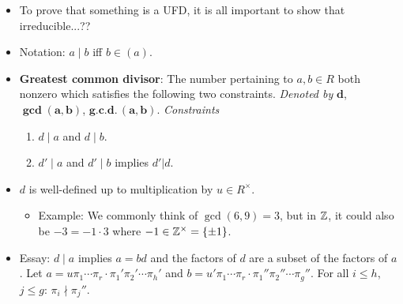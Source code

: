 \documentclass[../notes.tex]{subfiles}
\begin{document}
\begin{itemize}
\begin{proof}
        \begin{align*}
            a &= a\\
            u\pi_1\cdots\pi_r &= u'\pi_1'\cdots\pi_s'\\
            u\pi_1\cdots\pi_r &= u'u_1\pi_1\pi_2'\cdots\pi_s'\\
            u\pi_2\cdots\pi_r &= u'u_1\pi_2'\cdots\pi_s'
        \end{align*}
        where we apply the cancellation lemma in the last step, as permitted by the facts that $R$ is an integral domain and $\pi_1$ is irreducible (hence nonzero). Thus, by the induction hypothesis, the factorizations $u\pi_2\cdots\pi_r$ and $u'u_1\pi_2'\cdots\pi_s'$ are equivalent. It follows that $r=s$ and there exists $\sigma\in S_{[2:r]}$ and units $u_2,\dots,u_r\in R^\times$ such that $\pi_i'=u_i\pi_{\sigma(i)}$ ($i=2,\dots,r$). Extend $\sigma$ to $S_r$ by defining $\sigma(1)=1$. Thus, taking $\sigma\in S_r$ and $u_1,\dots,u_r\in R^\times$, we know that $\pi_i'=u_i\pi_i$ ($i=1,\dots,r$). Therefore, $u\pi_1\cdots\pi_r$ and $u'\pi_1'\cdots\pi_s'$ are equivalent factorizations of $a$, as desired.
    \end{proof}
    \item To prove that something is a UFD, it is all important to show that irreducible...??
    \item Notation: $a\mid b$ iff $b\in(a)$.
    \item \textbf{Greatest common divisor}: The number pertaining to $a,b\in R$ both nonzero which satisfies the following two constraints. \emph{Denoted by} $\bm{d}$, $\bm{\gcd(a,b)}$, $\bm{\textbf{g.c.d.}\,(a,b)}$. \emph{Constraints}
    \begin{enumerate}[label={(\roman*)}]
        \item $d\mid a$ and $d\mid b$.
        \item $d'\mid a$ and $d'\mid b$ implies $d'|d$.
    \end{enumerate}
    \item $d$ is well-defined up to multiplication by $u\in R^\times$.
    \begin{itemize}
        \item Example: We commonly think of $\gcd(6,9)=3$, but in $\mathbb{Z}$, it could also be $-3=-1\cdot 3$ where $-1\in\mathbb{Z}^\times=\{\pm 1\}$.
    \end{itemize}
    \item Essay: $d\mid a$ implies $a=bd$ and the factors of $d$ are a subset of the factors of $a$. Let $a=u\pi_1\cdots\pi_r\cdot\pi_1'\pi_2'\cdots\pi_h'$ and $b=u'\pi_1\cdots\pi_r\cdot\pi_1''\pi_2''\cdots\pi_g''$. For all $i\leq h$, $j\leq g$: $\pi_i\nmid\pi_j''$.

\end{itemize}
\end{document}

